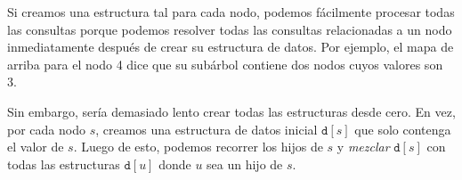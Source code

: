 \begin{center}
\end{center}

Si creamos una estructura tal para cada nodo, podemos fácilmente
procesar todas las consultas porque podemos resolver todas las
consultas relacionadas a un nodo inmediatamente después de crear su
estructura de datos. Por ejemplo, el mapa de arriba para el nodo 4
dice que su subárbol contiene dos nodos cuyos valores son 3.

Sin embargo, sería demasiado lento crear todas las estructuras desde cero.
En vez, por cada nodo $s$, creamos una estructura de datos inicial
$\texttt{d}[s]$ que solo contenga el valor de $s$. Luego de esto, podemos
recorrer los hijos de $s$ y \emph{mezclar} $\texttt{d}[s]$ con todas
las estructuras $\texttt{d}[u]$ donde $u$ sea un hijo de $s$.

